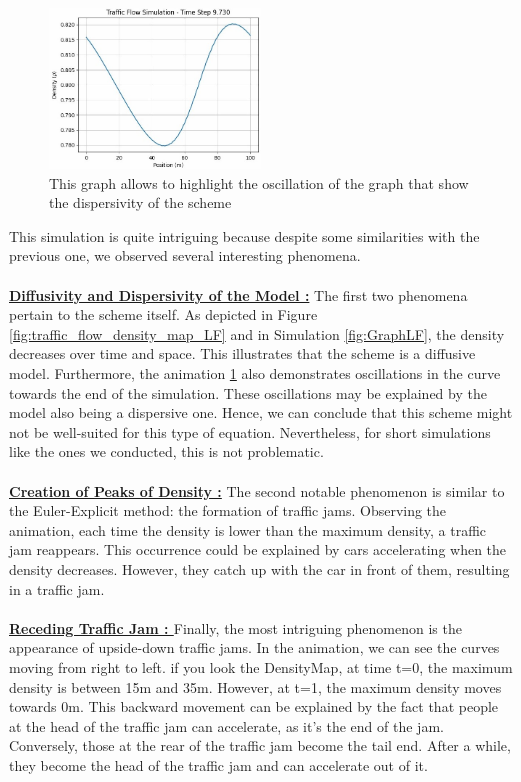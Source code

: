\documentclass{article}
\begin{document}
	\begin{figure}[H]
		\centering
		\includegraphics[width=0.5\textwidth]{AniE5_LF.jpg}
		\caption[Scheme Dispersivity]{This graph allows to highlight  the oscillation of the graph that show the dispersivity of the scheme}
		\label{fig:Dis}
	\end{figure}
	
	This simulation is quite intriguing because despite some similarities with the previous one, we observed several interesting phenomena.\\ \\ \textbf{\underline{Diffusivity and Dispersivity of the Model :}}
	The first two phenomena pertain to the scheme itself. As depicted in Figure \ref{fig:traffic_flow_density_map_LF} and in Simulation \ref{fig:GraphLF}, the density decreases over time and space. This illustrates that the scheme is a diffusive model. Furthermore, the animation \ref{fig:Dis} also demonstrates oscillations in the curve towards the end of the simulation. These oscillations may be explained by the model also being a dispersive one. Hence, we can conclude that this scheme might not be well-suited for this type of equation. Nevertheless, for short simulations like the ones we conducted, this is not problematic. \\ \\
	\textbf{\underline{Creation of Peaks of Density :}} The second notable phenomenon is similar to the Euler-Explicit method: the formation of traffic jams. Observing the animation, each time the density is lower than the maximum density, a traffic jam reappears. This occurrence could be explained by cars accelerating when the density decreases. However, they catch up with the car in front of them, resulting in a traffic jam. \\ \\ \textbf{\underline{Receding Traffic Jam : }} Finally, the most intriguing phenomenon is the appearance of upside-down traffic jams. In the animation, we can see the curves moving from right to left. if you look the DensityMap, at time t=0, the maximum density is between 15m and 35m. However, at t=1, the maximum density moves towards 0m. This backward movement can be explained by the fact that people at the head of the traffic jam can accelerate, as it's the end of the jam. Conversely, those at the rear of the traffic jam become the tail end. After a while, they become the head of the traffic jam and can accelerate out of it.
\end{document}
